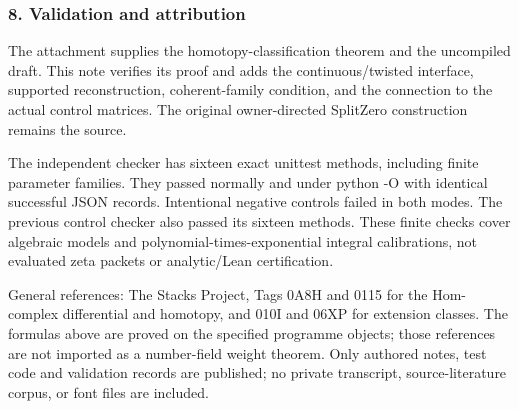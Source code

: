 \subsubsection{8. Validation and attribution}\label{pr_11:validation-and-attribution}

The attachment supplies the homotopy-classification theorem and the uncompiled draft. This note
verifies its proof and adds the continuous/twisted interface, supported reconstruction,
coherent-family condition, and the connection to the actual control matrices. The original
owner-directed SplitZero construction remains the source.

The independent checker has sixteen exact unittest methods, including finite parameter families.
They passed normally and under python -O with identical successful JSON records. Intentional
negative controls failed in both modes. The previous control checker also passed its sixteen
methods. These finite checks cover algebraic models and polynomial-times-exponential integral
calibrations, not evaluated zeta packets or analytic/Lean certification.

General references: The Stacks Project, Tags 0A8H and 0115 for the Hom-complex differential and
homotopy, and 010I and 06XP for extension classes. The formulas above are proved on the specified
programme objects; those references are not imported as a number-field weight theorem. Only authored
notes, test code and validation records are published; no private transcript, source-literature
corpus, or font files are included.
